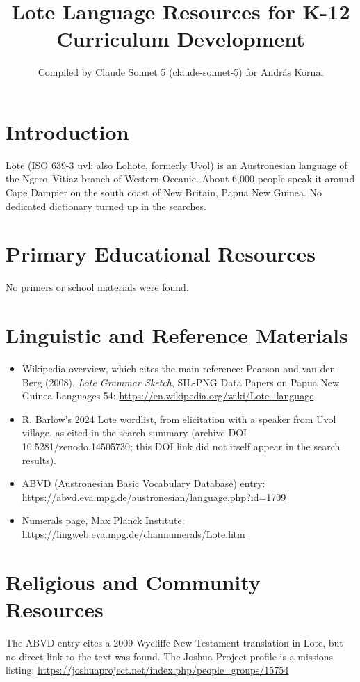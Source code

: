 \documentclass[12pt]{article}
\title{Lote Language Resources for K-12 Curriculum Development}
\author{Compiled by Claude Sonnet 5 (claude-sonnet-5) for Andr\'as Kornai}
\date{}
\begin{document}
\maketitle

\section{Introduction}
Lote (ISO 639-3 uvl; also Lohote, formerly Uvol) is an Austronesian language of the Ngero--Vitiaz branch of Western Oceanic. About 6,000 people speak it around Cape Dampier on the south coast of New Britain, Papua New Guinea. No dedicated dictionary turned up in the searches.

\section{Primary Educational Resources}
No primers or school materials were found.

\section{Linguistic and Reference Materials}
\begin{itemize}
\item Wikipedia overview, which cites the main reference: Pearson and van den Berg (2008), \emph{Lote Grammar Sketch}, SIL-PNG Data Papers on Papua New Guinea Languages 54: \url{https://en.wikipedia.org/wiki/Lote_language}
\item R. Barlow's 2024 Lote wordlist, from elicitation with a speaker from Uvol village, as cited in the search summary (archive DOI 10.5281/zenodo.14505730; this DOI link did not itself appear in the search results).
\item ABVD (Austronesian Basic Vocabulary Database) entry: \url{https://abvd.eva.mpg.de/austronesian/language.php?id=1709}
\item Numerals page, Max Planck Institute: \url{https://lingweb.eva.mpg.de/channumerals/Lote.htm}
\end{itemize}

\section{Religious and Community Resources}
The ABVD entry cites a 2009 Wycliffe New Testament translation in Lote, but no direct link to the text was found. The Joshua Project profile is a missions listing: \url{https://joshuaproject.net/index.php/people_groups/15754}
\end{document}
